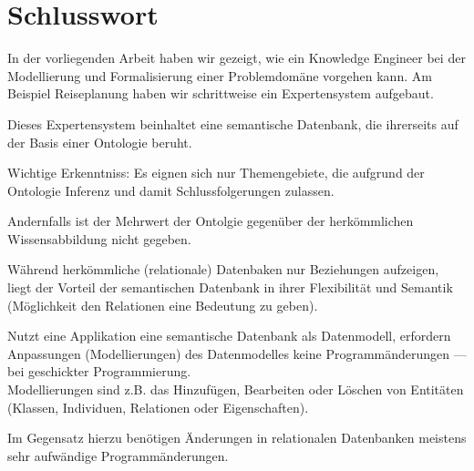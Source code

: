 \chapter{Schlusswort}
\label{chap:schlusswort}

In der vorliegenden Arbeit haben wir gezeigt, wie ein Knowledge Engineer bei der Modellierung und Formalisierung einer Problemdomäne vorgehen kann. Am Beispiel Reiseplanung haben wir schrittweise ein Expertensystem aufgebaut.

Dieses Expertensystem beinhaltet eine semantische Datenbank, die ihrerseits auf der Basis einer Ontologie beruht.

Wichtige Erkenntniss: Es eignen sich nur Themengebiete, die aufgrund der Ontologie Inferenz und damit Schlussfolgerungen zulassen.

Andernfalls ist der Mehrwert der Ontolgie gegenüber der herkömmlichen Wissensabbildung nicht gegeben.

Während herkömmliche (relationale) Datenbaken nur Beziehungen aufzeigen, liegt der Vorteil der semantischen Datenbank in ihrer Flexibilität und Semantik (Möglichkeit den Relationen eine Bedeutung zu geben).

Nutzt eine Applikation eine semantische Datenbank als Datenmodell, erfordern Anpassungen (Modellierungen) des Datenmodelles keine Programmänderungen --- bei geschickter Programmierung.\\
Modellierungen sind z.B. das Hinzufügen, Bearbeiten oder Löschen von Entitäten (Klassen, Individuen, Relationen oder Eigenschaften).

Im Gegensatz hierzu benötigen Änderungen in relationalen Datenbanken meistens sehr aufwändige Programmänderungen.
